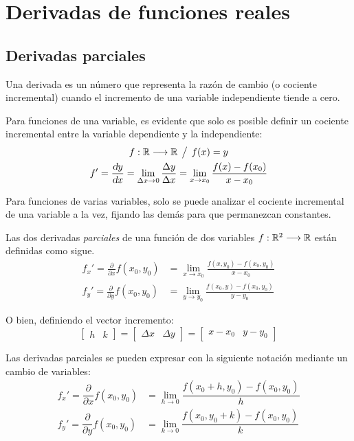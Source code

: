 \documentclass[a5paper,12pt,twoside]{book}
\begin{document}
\chapter{Derivadas de funciones reales}


\section{Derivadas parciales}

Una derivada es un número que representa la razón de cambio (o cociente incremental) cuando el incremento de una variable independiente tiende a cero.

Para funciones de una variable, es evidente que solo es posible definir un cociente incremental entre la variable dependiente y la independiente:
\begin{gather*}
    f:\mathbb{R}\longrightarrow\mathbb{R} \hspace{1ex} \big/ \hspace{1ex} f(x)=y
    \\
    f' = \frac{\textsl{d} y}{\textsl{d} x} = \lim_{\Delta x \to 0} \frac{\Delta y}{\Delta x} = \lim_{x \to x_0} \frac{f(x)-f(x_0)}{x-x_0}
\end{gather*}

Para funciones de varias variables, solo se puede analizar el cociente incremental de una variable a la vez, fijando las demás para que permanezcan constantes.

Las dos derivadas \emph{parciales} de una función de dos variables $f:\mathbb{R}^2 \longrightarrow \mathbb{R}$ están definidas como sigue.
\begin{align*}
    f_x' = \frac{\partial}{\partial x} f(x_0,y_0) &= \lim_{x \to x_0} \frac{f(x,y_0)-f(x_0,y_0)}{x-x_0}
    \\[1ex]
    f_y' = \frac{\partial}{\partial y} f(x_0,y_0) &= \lim_{y \to y_0} \frac{f(x_0,y)-f(x_0,y_0)}{y-y_0}
\end{align*}

O bien, definiendo el vector incremento:
\begin{equation*}
    \begin{bmatrix} h & k \end{bmatrix}
    = \begin{bmatrix} \Delta x & \Delta y \end{bmatrix}
    = \begin{bmatrix} x-x_0 & y-y_0 \end{bmatrix}
\end{equation*}

Las derivadas parciales se pueden expresar con la siguiente notación mediante un cambio de variables:
\begin{align*}
    f_x' = \dfrac{\partial}{\partial x} f(x_0,y_0) &= \lim_{h \to 0} \dfrac{f(x_0+h,y_0)-f(x_0,y_0)}{h}
    \\
    f_y' = \dfrac{\partial}{\partial y} f(x_0,y_0) &= \lim_{k \to 0} \dfrac{f(x_0,y_0+k)-f(x_0,y_0)}{k}
\end{align*}
\end{document}
